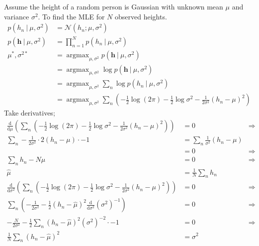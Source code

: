 \documentclass[a4paper, 12pt]{article}
\newcommand{\dif}[2]{\frac{\mathrm{d}#1}{\mathrm{d}#2}}
\newcommand{\summation}[2]{\sum\limits_{#1}^{#2}}
\newcommand{\product}[2]{\prod\limits_{#1}^{#2}}
\renewcommand{\vec}[1]{\boldsymbol{#1}}
\DeclareMathOperator*{\argmax}{argmax}
\begin{document}
            Assume the height of a random person is Gaussian with unknown mean $\mu$ and variance $\sigma^2$.
            To find the MLE for $N$ observed heights.
            \begin{align*}
                p(h_n\ |\ \mu, \sigma^2) & = \mathcal{N}(h_n; \mu, \sigma^2) \\
                p(\vec{h}\ |\ \mu, \sigma^2) & = \product{n = 1}{N} p(h_n\ |\ \mu, \sigma^2) \\
                \mu^*, \sigma^{2*} & = \argmax_{\mu, \sigma^2} p(\vec{h}\ |\ \mu, \sigma^2) \\
                & = \argmax_{\mu, \sigma^2} \log p(\vec{h}\ |\ \mu, \sigma^2) \\
                & = \argmax_{\mu, \sigma^2} \summation{n}{} \log p(h_n\ |\ \mu, \sigma^2) \\
                & = \argmax_{\mu, \sigma^2} \summation{n}{} \left(-\frac{1}{2} \log (2\pi) - \frac{1}{2} \log \sigma^2 - \frac{1}{2\sigma^2} (h_n - \mu)^2\right)
            \end{align*}
            Take derivatives;
            \begin{align*}
                \dif{}{\mu} \left(\summation{n}{} \left(-\frac{1}{2} \log (2\pi) - \frac{1}{2} \log \sigma^2 - \frac{1}{2\sigma^2} (h_n - \mu)^2\right)\right) & = 0 & \Rightarrow \\
                \summation{n}{} -\frac{1}{2\sigma^2} \cdot 2(h_n - \mu) \cdot -1 & = \summation{n}{} \frac{1}{\sigma^2}(h_n - \mu) \\
                & = 0 & \Rightarrow \\
                \summation{n}{} h_n - N\mu & = 0 & \Rightarrow \\
                \hat{\mu} & = \frac{1}{N} \summation{n}{} h_n \\
                \dif{}{\sigma^2} \left(\summation{n}{} \left(-\frac{1}{2} \log (2\pi) - \frac{1}{2} \log \sigma^2 - \frac{1}{2\sigma^2} (h_n - \mu)^2\right)\right) & = 0 & \Rightarrow \\
                \summation{n}{} \left(-\frac{1}{2\sigma^2} - \frac{1}{2}(h_n - \hat{\mu})^2 \dif{}{\sigma^2} (\sigma^2)^{-1}\right) & = 0 & \Rightarrow \\
                -\frac{N}{2\sigma^2} - \frac{1}{2}\summation{n}{} (h_n - \hat{\mu})^2 (\sigma^2)^{-2} \cdot -1 & = 0 & \Rightarrow \\
                \frac{1}{N} \summation{n}{} (h_n - \hat{\mu})^2 & = \sigma^2
            \end{align*}
\end{document}
